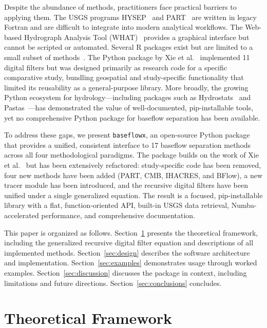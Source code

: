 \documentclass[hydrology,article,submit,pdftex,moreauthors]{Definitions/mdpi}
\begin{document}
Despite the abundance of methods, practitioners face practical barriers to applying them. The USGS programs HYSEP~\cite{Sloto1996} and PART~\cite{Rutledge1998} are written in legacy Fortran and are difficult to integrate into modern analytical workflows. The Web-based Hydrograph Analysis Tool (WHAT)~\cite{Lim2005} provides a graphical interface but cannot be scripted or automated. Several R packages exist but are limited to a small subset of methods~\cite{Pelletier2020}. The Python package by Xie et al.~\cite{Xie2020} implemented 11 digital filters but was designed primarily as research code for a specific comparative study, bundling geospatial and study-specific functionality that limited its reusability as a general-purpose library. More broadly, the growing Python ecosystem for hydrology---including packages such as Hydrostats~\cite{Roberts2018} and Pastas~\cite{Collenteur2019}---has demonstrated the value of well-documented, pip-installable tools, yet no comprehensive Python package for baseflow separation has been available.

To address these gaps, we present \texttt{baseflowx}, an open-source Python package that provides a unified, consistent interface to 17 baseflow separation methods across all four methodological paradigms. The package builds on the work of Xie et al.~\cite{Xie2020} but has been extensively refactored: study-specific code has been removed, four new methods have been added (PART, CMB, IHACRES, and BFlow), a new tracer module has been introduced, and the recursive digital filters have been unified under a single generalized equation. The result is a focused, pip-installable library with a flat, function-oriented API, built-in USGS data retrieval, Numba-accelerated performance, and comprehensive documentation.

This paper is organized as follows. Section~\ref{sec:framework} presents the theoretical framework, including the generalized recursive digital filter equation and descriptions of all implemented methods. Section~\ref{sec:design} describes the software architecture and implementation. Section~\ref{sec:examples} demonstrates usage through worked examples. Section~\ref{sec:discussion} discusses the package in context, including limitations and future directions. Section~\ref{sec:conclusions} concludes.

\section{Theoretical Framework}
\label{sec:framework}
\end{document}
